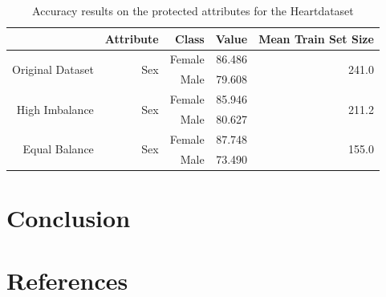 \documentclass[12pt]{article}
\begin{document}
\begin{table}[]
  \centering
  \begin{tabular}{@{}rrrrr@{}}
  \toprule
                                    & Attribute            & Class  & Value  & Mean Train Set Size    \\ \midrule
  \multirow{2}{*}{Original Dataset} & \multirow{2}{*}{Sex} & Female & 86.486 & \multirow{2}{*}{241.0} \\
                                    &                      & Male   & 79.608 &                        \\ \midrule
  \multirow{2}{*}{High Imbalance}   & \multirow{2}{*}{Sex} & Female & 85.946 & \multirow{2}{*}{211.2} \\
                                    &                      & Male   & 80.627 &                        \\ \midrule
  \multirow{2}{*}{Equal Balance}    & \multirow{2}{*}{Sex} & Female & 87.748 & \multirow{2}{*}{155.0} \\
                                    &                      & Male   & 73.490 &                        \\ \bottomrule
  \end{tabular}
  \caption{Accuracy results on the protected attributes for the Heartdataset}
  \label{tab:acc-heart}
\end{table}

  
\section{Conclusion}


\section{References}



\end{document}
